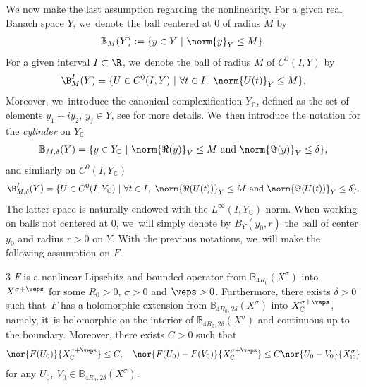 We now make the last assumption regarding the nonlinearity. For a given real Banach space $Y$, we~denote the ball centered at $0$ of radius $M$ by
\begin{align*}
\mathbb{B}_M(Y):=\{y\in Y\ |\ \norm{y}_Y\leq M\}.
\end{align*}
For a given interval $I\subset \R$, we~denote the ball of radius $M$ of $C^0(I, Y)$ by
\begin{align*}
\B_{M}^I(Y)=\{U\in C^0(I, Y)\ |\ \forall t\in I,\ \norm{U(t)}_Y\leq M\},
\end{align*}
Moreover, we~introduce the canonical complexification $Y_\mathbb{C}$, defined as the set of elements $y_1+iy_2$, $y_j\in Y$, see \cite[\S 2]{BS:71-polynomials} for more details. We~then introduce the notation for the \emph{cylinder} on $Y_\mathbb{C}$
\begin{align*}
\mathbb{B}_{M, \delta}(Y)=\{y\in Y_\mathbb{C}\ |\ \norm{\Re(y)}_Y\leq M\ \text{and}\ \norm{\Im(y)}_Y\leq \delta\},
\end{align*}
and similarly on $C^0(I, Y_\mathbb{C})$
\begin{align*}
\B_{M, \delta}^I(Y)=\{U\in C^0(I, Y_\mathbb{C})\ |\ \forall t\in I,\ \norm{\Re(U(t))}_Y\leq M\ \text{and}\ \norm{\Im(U(t))}_Y\leq \delta\}.
\end{align*}
The latter space is naturally endowed with the $L^\infty(I,Y_\mathbb{C})$-norm. When working on balls not centered at $0$, we~will simply denote by $B_Y(y_0, r)$ the ball of center $y_0$ and radius $r>0$ on $Y$. With the previous notations, we~will make the following assumption on $F$.
\begin{assump}{3}
\label{assumFholom}
$F$ is a nonlinear Lipschitz and bounded operator from $\mathbb{B}_{4R_{0}}(X^{\sigma})$ into $X^{\sigma+\veps}$ for some $R_{0}>0$, $\sigma>0$ and $\veps>0$. Furthermore, there exists $\delta>0$ such that~$F$ has a holomorphic extension from $\mathbb{B}_{4R_{0},2\delta}(X^{\sigma})$ into $X^{\sigma+\veps}_{\mathbb{C}}$, namely, it~is holomorphic on the interior of $\mathbb{B}_{4R_{0},2\delta}(X^{\sigma})$ and continuous up to the boundary. Moreover, there exists $C>0$ such that
\begin{align}
\label{boundFanalyticintro}
\nor{F(U_{0})}{X^{\sigma+\veps}_{\mathbb{C}}}\leq C,\quad \nor{F(U_{0})-F(V_{0})}{X^{\sigma+\veps}_{\mathbb{C}}}\leq C \nor{U_{0}-V_{0}}{X^{\sigma}_{\mathbb{C}}}
\end{align}
for any $U_{0},~V_{0}\in \mathbb{B}_{4R_{0},2\delta}(X^{\sigma})$.
\end{assump}

